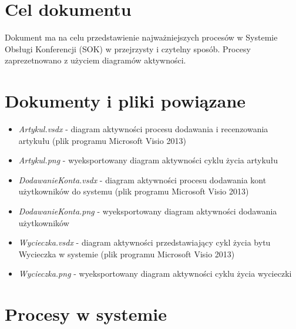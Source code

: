 \section{Cel dokumentu}
\suppressfloats[t]

Dokument ma na celu przedstawienie najważniejszych procesów w Systemie Obsługi Konferencji (SOK) w przejrzysty i czytelny sposób. Procesy zaprezetnowano z użyciem diagramów aktywności.

\section{Dokumenty i pliki powiązane}

\begin{itemize}
  \item \textit{Artykul.vsdx} - diagram aktywności procesu dodawania i recenzowania artykułu (plik programu Microsoft Visio 2013)
  \item \textit{Artykul.png} - wyeksportowany diagram aktywności cyklu życia artykułu
  \item \textit{DodawanieKonta.vsdx} - diagram aktywności procesu dodawania kont użytkowników do systemu (plik programu Microsoft Visio 2013)
  \item \textit{DodawanieKonta.png} - wyeksportowany diagram aktywności dodawania użytkowników
  \item \textit{Wycieczka.vsdx} - diagram aktywności przedstawiający cykl życia bytu Wycieczka w systemie (plik programu Microsoft Visio 2013)
  \item \textit{Wycieczka.png} - wyeksportowany diagram aktywności cyklu życia wycieczki 
\end{itemize}

\section{Procesy w systemie}

